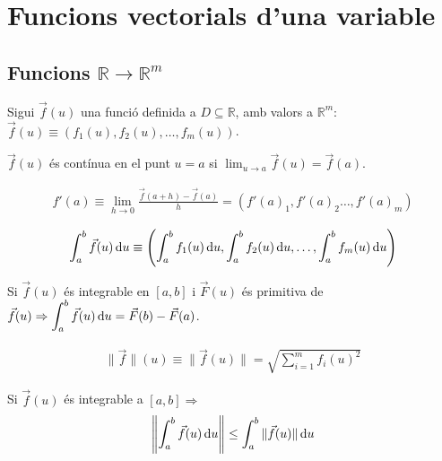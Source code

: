 \section{Funcions vectorials d'una variable}
\subsection{Funcions $\mathbb{R} \to \mathbb{R}^{m}$}
Sigui $\vec{f}(u)$ una funció definida a $D \subseteq \mathbb{R}$, amb valors a $\mathbb{R}^{m}$: $\vec{f}(u) \equiv (f_{1}(u), f_{2}(u), \dots , f_{m}(u))$.
\begin{defi}[Continuïtat]
    $\vec{f}(u)$ és contínua en el punt $u=a$ si $\lim_{u \to a} \vec{f}(u) = \vec{f}(a)$.
\end{defi}
\begin{defi}
    \begin{align*}
        f'(a) \equiv \lim_{h \to 0} \frac{\vec{f}(a+h) - \vec{f}(a)}{h} = (f'(a)_{1}, f'(a)_{2} \dots , f'(a)_{m})
    \end{align*}
\end{defi}
\begin{defi}
    \begin{align*}
        \displaystyle \int_{a}^{b} \vec{f}(u) \mathop{}\!\mathrm{d} u \equiv \left( \int_{a}^{b} f_{1}(u) \mathop{}\!\mathrm{d} u, \int_{a}^{b} f_{2}(u) \mathop{}\!\mathrm{d} u, \dots , \int_{a}^{b} f_{m}(u) \mathop{}\!\mathrm{d} u \right)
    \end{align*}
\end{defi}
\begin{thm}
    Si $\vec{f}(u)$ és integrable en $[a,b]$ i $\vec{F}(u)$ és primitiva de $\displaystyle \vec{f}(u) \Rightarrow \int_{a}^{b} \vec{f}(u) \mathop{}\!\mathrm{d} u = \vec{F}(b) - \vec{F}(a)$.
\end{thm}
\begin{defi}
    \begin{align*}
        \| \vec{f} \| (u) \equiv \| \vec{f}(u) \| = \sqrt{\sum\limits_{i=1}^{m} f_{i}(u)^{2}}
    \end{align*}
\end{defi}
\begin{thm}
    Si $\vec{f}(u)$ és integrable a $[a,b] \Rightarrow$ 
    \begin{align*}
        \left\| \int_{a}^{b} \vec{f}(u) \mathop{}\!\mathrm{d} u \right\| \leq \int_{a}^{b} \| \vec{f}(u) \| \mathop{}\!\mathrm{d} u
    \end{align*}
\end{thm}

